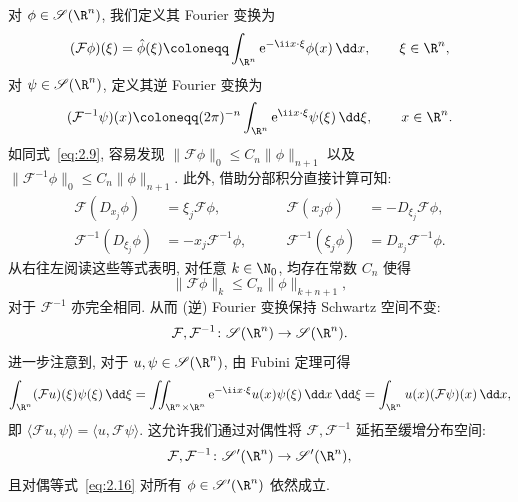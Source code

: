 对 $\phi \in \Schwartz(\R^n)$, 我们定义其 Fourier 变换为
\begin{equation}\label{eq:2.14}
    (\mathcal{F} \phi)(\xi) = \hat{\phi}(\xi) \defeq \int_{\R^n} \ee^{-\ii x \cdot \xi} \phi(x) \,\dd x, \qquad \xi \in \R^n,
\end{equation}
对 $\psi \in \Schwartz(\R^n)$, 定义其逆 Fourier 变换为
\begin{equation}\label{eq:2.15}
    (\mathcal{F}^{-1} \psi)(x) \defeq (2\pi)^{-n} \int_{\R^n} \ee^{\ii x \cdot \xi} \psi(\xi) \,\dd\xi, \qquad x \in \R^n.
\end{equation}
如同式~\eqref{eq:2.9}, 容易发现 $\|\mathcal{F} \phi\|_0 \le C_n \|\phi\|_{n+1}$ 以及 $\|\mathcal{F}^{-1} \phi\|_0 \le C_n \|\phi\|_{n+1}$. 此外, 借助分部积分直接计算可知:
\begin{equation}\label{eq:2.16}
    \begin{aligned}
        \mathcal{F}(D_{x_j} \phi) &= \xi_j \mathcal{F} \phi, &\qquad \mathcal{F}(x_j \phi) &= -D_{\xi_j} \mathcal{F} \phi, \\
        \mathcal{F}^{-1}(D_{\xi_j} \phi) &= -x_j \mathcal{F}^{-1} \phi, &\qquad \mathcal{F}^{-1}(\xi_j \phi) &= D_{x_j} \mathcal{F}^{-1} \phi.
    \end{aligned}
\end{equation}
从右往左阅读这些等式表明, 对任意 $k \in \N_0$, 均存在常数 $C_n$ 使得
\begin{equation}\label{eq:2.17}
    \|\mathcal{F} \phi\|_k \le C_n \|\phi\|_{k+n+1},
\end{equation}
对于 $\mathcal{F}^{-1}$ 亦完全相同. 从而 (逆) Fourier 变换保持 Schwartz 空间不变:
\begin{equation}\label{eq:2.18}
    \mathcal{F}, \mathcal{F}^{-1} \colon \Schwartz(\R^n) \to \Schwartz(\R^n).
\end{equation}
进一步注意到, 对于 $u, \psi \in \Schwartz(\R^n)$, 由 Fubini 定理可得
\begin{equation}\label{eq:2.19}
    \int_{\R^n} (\mathcal{F} u)(\xi) \psi(\xi) \,\dd\xi = \iint_{\R^n \times \R^n} \ee^{-\ii x \cdot \xi} u(x) \psi(\xi) \,\dd x \,\dd\xi = \int_{\R^n} u(x) (\mathcal{F} \psi)(x) \,\dd x,
\end{equation}
即 $\langle \mathcal{F} u, \psi \rangle = \langle u, \mathcal{F} \psi \rangle$. 这允许我们通过对偶性将 $\mathcal{F}, \mathcal{F}^{-1}$ 延拓至缓增分布空间:
\begin{equation}\label{eq:2.20}
    \mathcal{F}, \mathcal{F}^{-1} \colon \TempDistr(\R^n) \to \TempDistr(\R^n),
\end{equation}
且对偶等式~\eqref{eq:2.16} 对所有 $\phi \in \TempDistr(\R^n)$ 依然成立.

